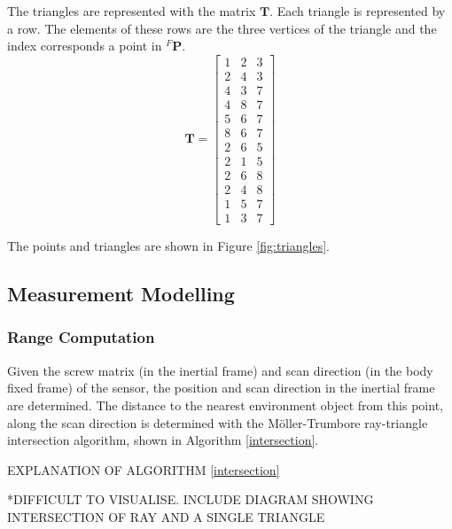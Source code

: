 The triangles are represented with the matrix $\mathbf{T}$. Each triangle is represented by a row. The elements of these rows are the three vertices of the triangle and the index corresponds a point in ${^{F}\mathbf{P}}$.
\begin{equation}
	\mathbf{T} = 
	\begin{bmatrix}
	1 & 2 & 3 \\
	2 & 4 & 3 \\
    4 & 3 & 7 \\
    4 & 8 & 7 \\
    5 & 6 & 7 \\
    8 & 6 & 7 \\
    2 & 6 & 5 \\
    2 & 1 & 5 \\
    2 & 6 & 8 \\
    2 & 4 & 8 \\
    1 & 5 & 7 \\
    1 & 3 & 7
	\end{bmatrix}
\end{equation}

The points and triangles are shown in Figure \ref{fig:triangles}.


\subsection{Measurement Modelling}
	\subsubsection{Range Computation}
	Given the screw matrix (in the inertial frame) and scan direction (in the body fixed frame) of the sensor, the position and scan direction in the inertial frame are determined.
	The distance to the nearest environment object from this point, along the scan direction is determined with the M{\"o}ller-Trumbore ray-triangle intersection algorithm, shown in Algorithm \ref{intersection}.
	
	EXPLANATION OF ALGORITHM \ref{intersection}
	
	*DIFFICULT TO VISUALISE. INCLUDE DIAGRAM SHOWING INTERSECTION OF RAY AND A SINGLE TRIANGLE

